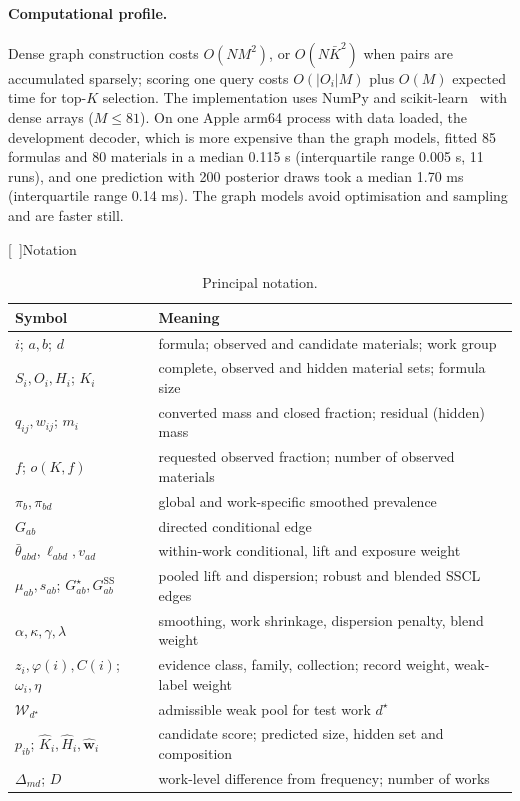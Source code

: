 \documentclass[10pt,a4paper]{article}
\makeatletter
\renewcommand{\section}{\@startsection{section}{1}{0pt}{12pt plus 2pt}{6pt}{\normalfont\normalsize\bfseries}}
\renewcommand{\thesection}{\arabic{section}}
\newcommand{\fmly}{\varphi}
\makeatother
\begin{document}
\paragraph{Computational profile.} Dense graph construction costs $O(NM^2)$, or $O(N\bar K^2)$ when pairs are accumulated sparsely; scoring one query costs $O(|O_i|M)$ plus $O(M)$ expected time for top-$K$ selection. The implementation uses NumPy and scikit-learn~\cite{pedregosa2011} with dense arrays ($M\le81$). On one Apple arm64 process with data loaded, the development decoder, which is more expensive than the graph models, fitted 85 formulas and 80 materials in a median 0.115 s (interquartile range 0.005 s, 11 runs), and one prediction with 200 posterior draws took a median 1.70 ms (interquartile range 0.14 ms). The graph models avoid optimisation and sampling and are faster still.

\section[\appendixname~\thesection]{Notation}
\label{app:notation}

\begin{table}[H]
\caption{Principal notation.}
\label{tab:notation}
\small
\begin{tabularx}{\textwidth}{lL}
\toprule
\textbf{Symbol} & \textbf{Meaning} \\
\midrule
$i$; $a,b$; $d$ & formula; observed and candidate materials; work group \\
$S_i,O_i,H_i$; $K_i$ & complete, observed and hidden material sets; formula size \\
$q_{ij},w_{ij}$; $m_i$ & converted mass and closed fraction; residual (hidden) mass \\
$f$; $o(K,f)$ & requested observed fraction; number of observed materials \\
$\pi_b,\pi_{bd}$ & global and work-specific smoothed prevalence \\
$G_{ab}$ & directed conditional edge \\
$\bar\theta_{abd},\ell_{abd},v_{ad}$ & within-work conditional, lift and exposure weight \\
$\mu_{ab},s_{ab}$; $G^\star_{ab},G^{\mathrm{SS}}_{ab}$ & pooled lift and dispersion; robust and blended SSCL edges \\
$\alpha,\kappa,\gamma,\lambda$ & smoothing, work shrinkage, dispersion penalty, blend weight \\
$z_i,\fmly(i),C(i)$; $\omega_i,\eta$ & evidence class, family, collection; record weight, weak-label weight \\
$\mathcal W_{d^\star}$ & admissible weak pool for test work $d^\star$ \\
$p_{ib}$; $\widehat K_i,\widehat H_i,\widehat{\bm w}_i$ & candidate score; predicted size, hidden set and composition \\
$\Delta_{md}$; $D$ & work-level difference from frequency; number of works \\
\bottomrule
\end{tabularx}
\end{table}
\end{document}
